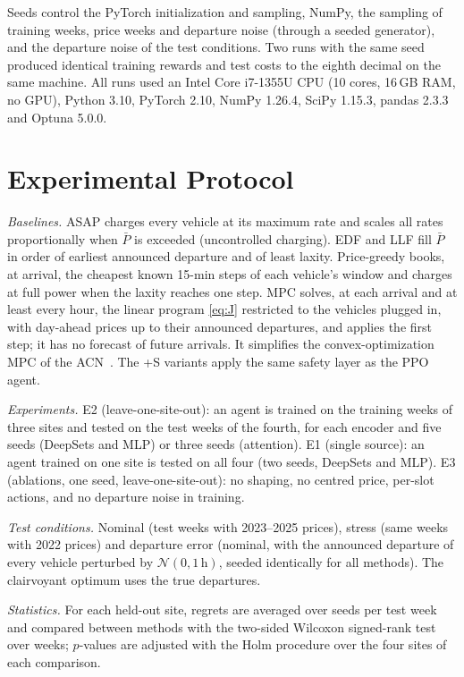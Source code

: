 \documentclass[conference]{IEEEtran}
\begin{document}
Seeds control the PyTorch initialization and sampling, NumPy, the sampling of training weeks,
price weeks and departure noise (through a seeded generator), and the departure noise of the test
conditions. Two runs with the same seed produced identical training rewards and test costs to the
eighth decimal on the same machine. All runs used an Intel Core i7-1355U CPU (10 cores, 16\,GB RAM,
no GPU), Python 3.10, PyTorch 2.10, NumPy 1.26.4, SciPy 1.15.3, pandas 2.3.3 and Optuna 5.0.0.

\section{Experimental Protocol}
\emph{Baselines.} ASAP charges every vehicle at its maximum rate and scales all rates proportionally
when $\bar P$ is exceeded (uncontrolled charging). EDF and LLF fill $\bar P$ in order of earliest
announced departure and of least laxity. Price-greedy books, at arrival, the cheapest known
15-min steps of each vehicle's window and charges at full power when the laxity reaches one step.
MPC solves, at each arrival and at least every hour, the linear program \eqref{eq:J} restricted to
the vehicles plugged in, with day-ahead prices up to their announced departures, and applies the
first step; it has no forecast of future arrivals. It simplifies the convex-optimization MPC of the ACN~\cite{lee2021acn}. The +S variants apply the same safety layer as
the PPO agent.

\emph{Experiments.} E2 (leave-one-site-out): an agent is trained on the training weeks of three sites
and tested on the test weeks of the fourth, for each encoder and five seeds (DeepSets and MLP) or
three seeds (attention). E1 (single source): an agent trained on one site is tested on all four
(two seeds, DeepSets and MLP). E3 (ablations, one seed, leave-one-site-out): no shaping, no centred
price, per-slot actions, and no departure noise in training.

\emph{Test conditions.} Nominal (test weeks with 2023--2025 prices), stress (same weeks with 2022
prices) and departure error (nominal, with the announced departure of every vehicle perturbed by
$\mathcal N(0,1\,\mathrm h)$, seeded identically for all methods). The clairvoyant optimum uses the
true departures.

\emph{Statistics.} For each held-out site, regrets are averaged over seeds per test week and
compared between methods with the two-sided Wilcoxon signed-rank test over weeks; $p$-values are
adjusted with the Holm procedure over the four sites of each comparison.
\end{document}
